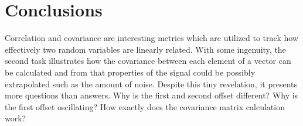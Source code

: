 \section{Conclusions} 
Correlation and covariance are interesting metrics which are utilized to track how effectively two random variables are linearly related. With some ingenuity, the second task illustrates how the covariance between each element of a vector can be calculated and from that properties of the signal could be possibly extrapolated such as the amount of noise. Despite this tiny revelation, it presents more questions than answers. Why is the first and second offset different? Why is the first offset oscillating?  How exactly does the covariance matrix calculation work? 

